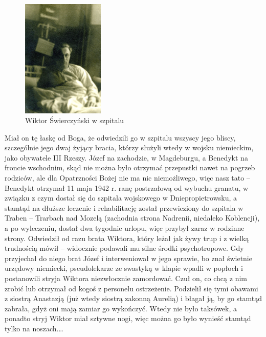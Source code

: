 \begin{figure}[!h]
\begin{center}
\includegraphics[width=0.35\textwidth]{photo/wiktor_swierczynski_4.jpg}
\caption{Wiktor Świerczyński w szpitalu}
\label{rys:wiktor_swierczynski_4}
\end{center}
\end{figure}

Miał on tę łaskę od Boga, że odwiedzili go w szpitalu wszyscy jego bliscy, szczególnie jego dwaj żyjący bracia, którzy służyli wtedy w wojsku niemieckim, jako obywatele III Rzeszy. Józef na zachodzie, w Magdeburgu, a Benedykt na froncie wschodnim, skąd nie można było otrzymać przepustki nawet na pogrzeb rodziców, ale dla Opatrzności Bożej nie ma nic niemożliwego, więc nasz tato – Benedykt otrzymał 11 maja 1942 r. ranę postrzałową od wybuchu granatu, w związku z czym dostał się do szpitala wojskowego w Dniepropietrowsku, a stamtąd na dłuższe leczenie i rehabilitację został przewieziony do szpitala w Traben -- Trarbach nad Mozelą (zachodnia strona Nadrenii, niedaleko Koblencji), a po wyleczeniu, dostał dwa tygodnie urlopu, więc przybył zaraz w rodzinne strony. Odwiedził od razu brata Wiktora, który leżał jak żywy trup i z wielką trudnością mówił -- widocznie podawali mu silne środki psychotropowe. Gdy przyjechał do niego brat Józef i interweniował w jego sprawie, bo znał świetnie urzędowy niemiecki, pseudolekarze ze swastyką w klapie wpadli w popłoch i postanowili stryja Wiktora niezwłocznie zamordować. Czuł on, co chcą z nim zrobić lub otrzymał od kogoś z personelu ostrzeżenie. Podzielił się tymi obawami z siostrą Anastazją (już wtedy siostrą zakonną Aurelią) i błagał ją, by go stamtąd zabrała, gdyż oni mają zamiar go wykończyć. Wtedy nie było taksówek, a ponadto stryj Wiktor miał sztywne nogi, więc można go było wynieść stamtąd tylko na noszach.\ldots

